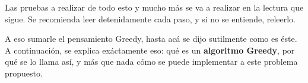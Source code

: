 Las pruebas a realizar de todo esto y mucho más se va a realizar en la lectura que sigue. Se recomienda leer detenidamente cada paso, y si no se entiende, releerlo. 

A eso sumarle el pensamiento Greedy, hasta acá se dijo sutilmente como es éste. A continuación, se explica exáctamente eso: qué es un \textbf{algoritmo Greedy}, por qué se lo llama así, y más que nada cómo se puede implementar a este problema propuesto.


